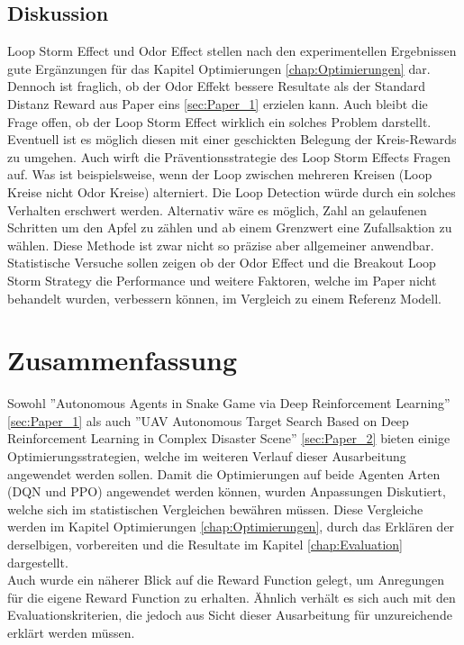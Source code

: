 \subsection{Diskussion}
Loop Storm Effect und Odor Effect stellen nach den experimentellen Ergebnissen gute Ergänzungen für das Kapitel Optimierungen \ref{chap:Optimierungen} dar. Dennoch ist fraglich, ob der Odor Effekt bessere Resultate als der Standard Distanz Reward aus Paper eins \ref{sec:Paper_1} erzielen kann. Auch bleibt die Frage offen, ob der Loop Storm Effect wirklich ein solches Problem darstellt. Eventuell ist es möglich diesen mit einer geschickten Belegung der Kreis-Rewards zu umgehen. Auch wirft die Präventionsstrategie des Loop Storm Effects Fragen auf. Was ist beispielsweise, wenn der Loop zwischen mehreren Kreisen (Loop Kreise nicht Odor Kreise) alterniert. Die Loop Detection würde durch ein solches Verhalten erschwert werden. Alternativ wäre es möglich, Zahl an gelaufenen Schritten um den Apfel zu zählen und ab einem Grenzwert eine Zufallsaktion zu wählen. Diese Methode ist zwar nicht so präzise aber allgemeiner anwendbar. Statistische Versuche sollen zeigen ob der Odor Effect und die Breakout Loop Storm Strategy die Performance und weitere Faktoren, welche im Paper nicht behandelt wurden, verbessern können, im Vergleich zu einem Referenz Modell.

\section{Zusammenfassung}
Sowohl ''Autonomous Agents in Snake Game via Deep Reinforcement Learning'' \ref{sec:Paper_1} als auch ''UAV Autonomous Target Search Based on Deep Reinforcement Learning in Complex Disaster Scene'' \ref{sec:Paper_2} bieten einige Optimierungsstrategien, welche im weiteren Verlauf dieser Ausarbeitung angewendet werden sollen. Damit die Optimierungen auf beide Agenten Arten (DQN und PPO) angewendet werden können, wurden Anpassungen Diskutiert, welche sich im statistischen Vergleichen bewähren müssen. Diese Vergleiche werden im Kapitel Optimierungen \ref{chap:Optimierungen}, durch das Erklären der derselbigen, vorbereiten und die Resultate im Kapitel \ref{chap:Evaluation} dargestellt.\\
Auch wurde ein näherer Blick auf die Reward Function gelegt, um Anregungen für die eigene Reward Function zu erhalten. Ähnlich verhält es sich auch mit den Evaluationskriterien, die jedoch aus Sicht dieser Ausarbeitung für unzureichende erklärt werden müssen.
